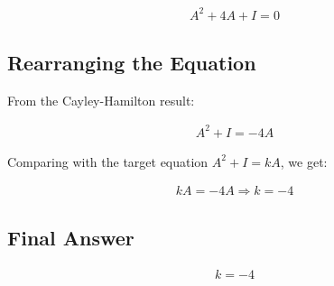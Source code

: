 \documentclass{article}
\begin{document}
\begin{align}
A^2 + 4A + I = 0
\end{align}


\subsection*{Rearranging the Equation}

From the Cayley-Hamilton result:

\begin{align}
A^2 + I = -4A
\end{align}

Comparing with the target equation $A^2 + I = kA$, we get:

\begin{align}
kA = -4A \Rightarrow \boxed{k = -4}
\end{align}


\subsection*{Final Answer}

\begin{align}
\boxed{k = -4}
\end{align}
\end{document}
